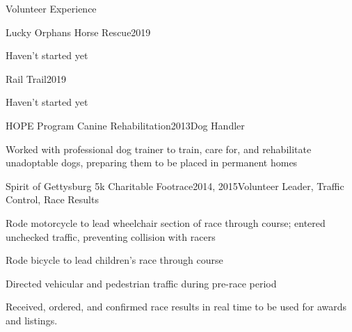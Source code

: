 \documentclass{resume} %
\begin{document}


\begin{rSection}{Volunteer Experience}


\begin{rWorkSubsection}{Lucky Orphans Horse Rescue}{2019}{}{}
\item Haven't started yet
\end{rWorkSubsection}


\begin{rWorkSubsection}{Rail Trail}{2019}{}{}
\item Haven't started yet
\end{rWorkSubsection}


\begin{rWorkSubsection}{HOPE Program Canine Rehabilitation}{2013}{Dog Handler}{}
\item Worked with professional dog trainer to train, care for, and rehabilitate unadoptable dogs, preparing them to be placed in permanent homes
\end{rWorkSubsection}


\begin{rWorkSubsection}{Spirit of Gettysburg 5k Charitable Footrace}{2014, 2015}{Volunteer Leader, Traffic Control, Race Results}{}
\item Rode motorcycle to lead wheelchair section of race through course; entered unchecked traffic, preventing collision with racers
\item Rode bicycle to lead children's race through course
\item Directed vehicular and pedestrian traffic during pre-race period
\item Received, ordered, and confirmed race results in real time to be used for awards and listings.
\end{rWorkSubsection}



\end{rSection}
\end{document}
